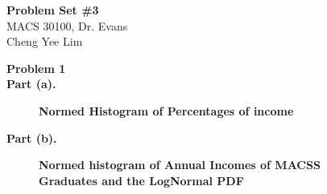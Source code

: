 \documentclass[letterpaper,12pt]{article}
\theoremstyle{definition}
\begin{document}
\begin{flushleft}
  \textbf{\large{Problem Set \#3}} \\
  MACS 30100, Dr. Evans \\
  Cheng Yee Lim
\end{flushleft}

\vspace{5mm}

\noindent\textbf{Problem 1}\\
\textbf{Part (a).}
\begin{figure}[htb]\centering\captionsetup{width=4.0in}
  \caption{\textbf{Normed Histogram of Percentages of income}}\label{FigExample}
\end{figure}

\pagebreak
\textbf{Part (b).} \\
\begin{figure}[htb]\centering\captionsetup{width=4.0in}
  \caption{\textbf{Normed histogram of Annual Incomes of MACSS Graduates and the LogNormal PDF}}\label{FigExample}
\end{figure}
\end{document}

